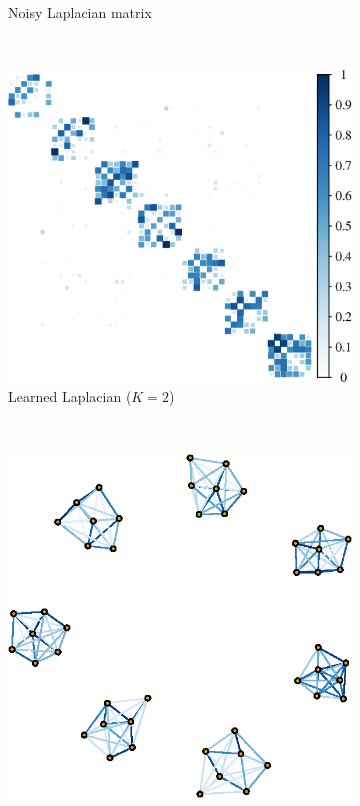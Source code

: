 \begin{figure}[!htb]
\begin{subfigure}[b]{0.3\textwidth}
        \caption{Noisy Laplacian matrix}
    \end{subfigure}
    ~ %
    \begin{subfigure}[b]{0.3\textwidth}
        \includegraphics[width=\textwidth]{model-mismatch/est_mat.eps}
        \caption{Learned Laplacian ($K = 2$)}
    \end{subfigure}
        \\
    \begin{subfigure}[b]{0.3\textwidth}
        \includegraphics[width=\textwidth]{model-mismatch/true_graph.eps}

\end{subfigure}
\end{figure}
